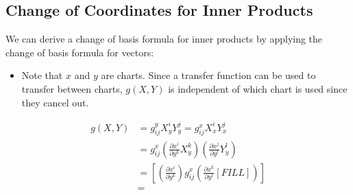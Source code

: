 \documentclass[10pt]{article}
\begin{document}
\subsection*{Change of Coordinates for Inner Products}
We can derive a change of basis formula for inner products by applying the change of basis formula for vectors:
\begin{itemize}
    \item Note that $x$ and $y$ are charts.  Since a transfer function can be used to transfer between charts, $g(X, Y)$ is independent of which chart is used since they cancel out.
\end{itemize}
\begin{align*}
    g(X, Y) &= g_{ij}^y X_y^i Y_y^j = g_{ij}^x X_x^i Y_x^j\\
    &= g_{ij}^x \left(\frac{\partial x^i}{\partial y^k} X_y^k\right) \left(\frac{\partial x^j}{\partial y^l} Y_y^l\right)\\
    &= \left[\left(\frac{\partial x^i}{\partial y^k}\right) g_{ij}^x \left(\frac{\partial x^k}{\partial y^l} [FILL]\right)\right]\\
    &= 
\end{align*}
 
\end{document}
